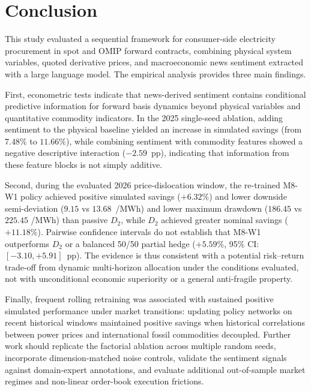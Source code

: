 \section{Conclusion}
\label{sec:conclusion}

This study evaluated a sequential framework for consumer-side electricity procurement in spot and OMIP forward contracts, combining physical system variables, quoted derivative prices, and macroeconomic news sentiment extracted with a large language model. The empirical analysis provides three main findings.

First, econometric tests indicate that news-derived sentiment contains conditional predictive information for forward basis dynamics beyond physical variables and quantitative commodity indicators. In the 2025 single-seed ablation, adding sentiment to the physical baseline yielded an increase in simulated savings (from $7.48\%$ to $11.66\%$), while combining sentiment with commodity features showed a negative descriptive interaction ($-2.59$~pp), indicating that information from these feature blocks is not simply additive.

Second, during the evaluated 2026 price-dislocation window, the re-trained M8-W1 policy achieved positive simulated savings ($+6.32\%$) and lower downside semi-deviation ($9.15$ vs $13.68$~\texteuro/MWh) and lower maximum drawdown ($186.45$ vs $225.45$ \texteuro/MWh) than passive $D_2$, while $D_2$ achieved greater nominal savings ($+11.18\%$). Pairwise confidence intervals do not establish that M8-W1 outperforms $D_2$ or a balanced 50/50 partial hedge ($+5.59\%$, 95\% CI: $[-3.10,\allowbreak +5.91]$~pp). The evidence is thus consistent with a potential risk--return trade-off from dynamic multi-horizon allocation under the conditions evaluated, not with unconditional economic superiority or a general anti-fragile property.

Finally, frequent rolling retraining was associated with sustained positive simulated performance under market transitions: updating policy networks on recent historical windows maintained positive savings when historical correlations between power prices and international fossil commodities decoupled. Further work should replicate the factorial ablation across multiple random seeds, incorporate dimension-matched noise controls, validate the sentiment signals against domain-expert annotations, and evaluate additional out-of-sample market regimes and non-linear order-book execution frictions.
